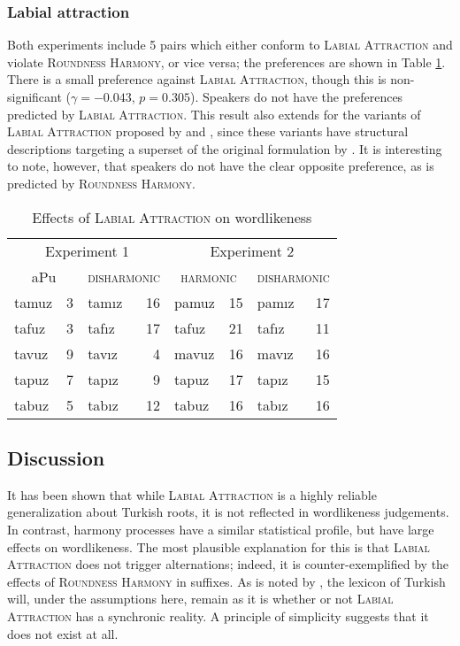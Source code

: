 \subsubsection{Labial attraction}

Both experiments include 5 pairs which either conform to \textsc{Labial Attraction} and violate \textsc{Roundness Harmony}, or vice versa; the preferences are shown in Table \ref{law}. There is a small preference against \textsc{Labial Attraction}, though this is non-significant ($\gamma = -0.043$, $p = 0.305$). Speakers do not have the preferences predicted by \textsc{Labial Attraction}. This result also extends for the variants of \textsc{Labial Attraction} proposed by \citet{Zimmer1969} and \citet{Inkelas2001}, since these variants have structural descriptions targeting a superset of the original formulation by \citet{Lees1966a}. It is interesting to note, however, that speakers do not have the clear opposite preference, as is predicted by \textsc{Roundness Harmony}. 

\begin{table}
\centering
\begin{tabular}{lrlr|lrlr}
\toprule
\multicolumn{4}{c|}{Experiment 1} & \multicolumn{4}{c}{Experiment 2} \\
\multicolumn{2}{c}{aPu} & \multicolumn{2}{c|}{\textsc{disharmonic}} & \multicolumn{2}{c}{\textsc{harmonic}} & \multicolumn{2}{c}{\textsc{disharmonic}} \\
\midrule
{tamuz} & 3 & {tamız} & 16 & {pamuz} & 15 & {pamız} & 17 \\
{tafuz} & 3 & {tafız} & 17 & {tafuz} & 21 & {tafız} & 11 \\
{tavuz} & 9 & {tavız} & 4  & {mavuz} & 16 & {mavız} & 16 \\
{tapuz} & 7 & {tapız} & 9  & {tapuz} & 17 & {tapız} & 15 \\
{tabuz} & 5 & {tabız} & 12 & {tabuz} & 16 & {tabız} & 16 \\
\bottomrule
\end{tabular}
\caption{Effects of \textsc{Labial Attraction} on wordlikeness \citep[from][]{Zimmer1969}}
\label{law}
\end{table}

\subsection{Discussion}

It has been shown that while \textsc{Labial Attraction} is a highly reliable generalization about Turkish roots, it is not reflected in wordlikeness judgements. In contrast, harmony processes have a similar statistical profile, but have large effects on wordlikeness. The most plausible explanation for this is that  \textsc{Labial Attraction} does not trigger alternations; indeed, it is counter-exemplified by the effects of \textsc{Roundness Harmony} in suffixes. As is noted by \citet[412f.]{Inkelas1997}, the lexicon of Turkish will, under the assumptions here, remain as it is whether or not \textsc{Labial Attraction} has a synchronic reality. A principle of simplicity suggests that it does not exist at all.

